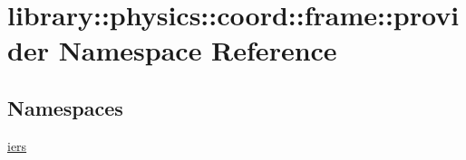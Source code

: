 \hypertarget{namespacelibrary_1_1physics_1_1coord_1_1frame_1_1provider}{}\section{library\+:\+:physics\+:\+:coord\+:\+:frame\+:\+:provider Namespace Reference}
\label{namespacelibrary_1_1physics_1_1coord_1_1frame_1_1provider}
\subsection*{Namespaces}
\begin{DoxyCompactItemize}
\item 
 \hyperlink{namespacelibrary_1_1physics_1_1coord_1_1frame_1_1provider_1_1iers}{iers}
\end{DoxyCompactItemize}
